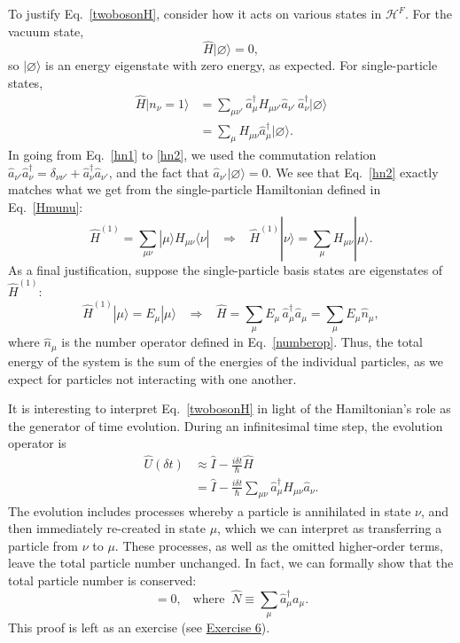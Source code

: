 \documentclass[prx,12pt]{revtex4-2}
\begin{document}
To justify Eq.~\eqref{twobosonH}, consider how it acts on various
states in $\mathscr{H}^F$.  For the vacuum state,
\begin{equation}
  \hat{H}|\varnothing\rangle = 0,
\end{equation}
so $|\varnothing\rangle$ is an energy eigenstate with zero energy, as
expected.  For single-particle states,
\begin{align}
  \hat{H} |n_\nu = 1\rangle
  &= \sum_{\mu\nu'} \hat{a}^\dagger_{\mu} H_{\mu\nu'} \hat{a}_{\nu'}\,
  \hat{a}_\nu^\dagger | \varnothing\rangle \label{hn1} \\
  &= \sum_{\mu} H_{\mu\nu} \hat{a}^\dagger_{\mu} |\varnothing\rangle.
      \label{hn2}
\end{align}
In going from Eq.~\eqref{hn1} to \eqref{hn2}, we used the commutation
relation $\hat{a}_{\nu'} \hat{a}_\nu^\dagger = \delta_{\nu\nu'} +
\hat{a}_\nu^\dagger \hat{a}_{\nu'}$, and the fact that
$\hat{a}_{\nu'}|\varnothing\rangle = 0$.  We see that Eq.~\eqref{hn2}
exactly matches what we get from the single-particle Hamiltonian
defined in Eq.~\eqref{Hmunu}:
\begin{equation}
  \hat{H}^{(1)} = \sum_{\mu\nu} |\mu\rangle H_{\mu\nu} \langle \nu|
  \;\;\;\Rightarrow\;\;\;
  \hat{H}^{(1)} |\nu\rangle = \sum_\mu H_{\mu\nu} |\mu\rangle.
\end{equation}
As a final justification, suppose the single-particle basis states are
eigenstates of $\hat{H}^{(1)}$:
\begin{equation}
  \hat{H}^{(1)}|\mu\rangle = E_\mu |\mu\rangle
  \;\;\;\Rightarrow\;\;\;
  \hat{H} = \sum_{\mu} E_\mu \, \hat{a}^\dagger_\mu \hat{a}_\mu
  = \sum_{\mu} E_\mu \hat{n}_\mu,
\end{equation}
where $\hat{n}_\mu$ is the number operator defined in
Eq.~\eqref{numberop}.  Thus, the total energy of the system is the sum
of the energies of the individual particles, as we expect for
particles not interacting with one another.

It is interesting to interpret Eq.~\eqref{twobosonH} in light of the
Hamiltonian's role as the generator of time evolution.  During an
infinitesimal time step, the evolution operator is
\begin{align}
  \hat{U}(\delta t) &\approx
  \hat{I} - \frac{i \delta t}{\hbar} \hat{H} \\
  &= \hat{I} - \frac{i \delta t}{\hbar} \sum_{\mu\nu} \hat{a}^\dagger_\mu H_{\mu\nu} \hat{a}_\nu.
\end{align}
The evolution includes processes whereby a particle is annihilated in
state $\nu$, and then immediately re-created in state $\mu$, which we
can interpret as transferring a particle from $\nu$ to $\mu$.  These
processes, as well as the omitted higher-order terms, leave the total
particle number unchanged.  In fact, we can formally show that the
total particle number is conserved:
\begin{equation}
  [\hat{H}, \hat{N}] = 0, \;\;\;\mathrm{where}\;\;\hat{N} \equiv \sum_\mu \hat{a}_\mu^\dagger a_\mu.
  \label{Hdiag}
\end{equation}
This proof is left as an exercise (see
\hyperref[ex:n_conserved]{Exercise 6}).
\end{document}
